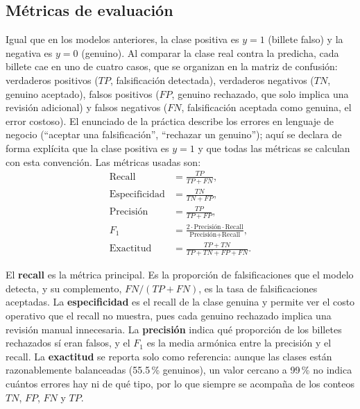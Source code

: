 \documentclass[conference]{IEEEtran}
\begin{document}
    \subsection{Métricas de evaluación}
    \label{sec:metricas}
    
    Igual que en los modelos anteriores, la clase positiva es $y=1$ (billete falso) y la negativa es $y=0$ (genuino). Al comparar la clase real contra la predicha, cada billete cae en uno de cuatro casos, que se organizan en la matriz de confusión: verdaderos positivos ($TP$, falsificación detectada), verdaderos negativos ($TN$, genuino aceptado), falsos positivos ($FP$, genuino rechazado, que solo implica una revisión adicional) y falsos negativos ($FN$, falsificación aceptada como genuina, el error costoso). El enunciado de la práctica describe los errores en lenguaje de negocio (``aceptar una falsificación'', ``rechazar un genuino''); aquí se declara de forma explícita que la clase positiva es $y=1$ y que todas las métricas se calculan con esta convención. Las métricas usadas son:
    \begin{align}
    	\text{Recall} &= \frac{TP}{TP+FN}, \label{eq:recall}\\
    	\text{Especificidad} &= \frac{TN}{TN+FP}, \label{eq:espec}\\
    	\text{Precisión} &= \frac{TP}{TP+FP}, \label{eq:prec}\\
    	F_1 &= \frac{2\cdot\text{Precisión}\cdot\text{Recall}}{\text{Precisión}+\text{Recall}}, \label{eq:f1}\\
    	\text{Exactitud} &= \frac{TP+TN}{TP+TN+FP+FN}. \label{eq:acc}
    \end{align}
    
    El \textbf{recall} es la métrica principal. Es la proporción de falsificaciones que el modelo detecta, y su complemento, $FN/(TP+FN)$, es la tasa de falsificaciones aceptadas. La \textbf{especificidad} es el recall de la clase genuina y permite ver el costo operativo que el recall no muestra, pues cada genuino rechazado implica una revisión manual innecesaria. La \textbf{precisión} indica qué proporción de los billetes rechazados sí eran falsos, y el $F_1$ es la media armónica entre la precisión y el recall. La \textbf{exactitud} se reporta solo como referencia: aunque las clases están razonablemente balanceadas (55.5\,\% genuinos), un valor cercano a 99\,\% no indica cuántos errores hay ni de qué tipo, por lo que siempre se acompaña de los conteos $TN$, $FP$, $FN$ y $TP$.
    
\end{document}
